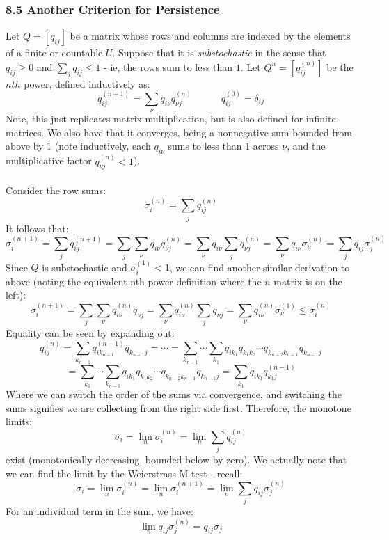 \documentclass[12pt,a4paper]{article}
\newcommand{\1}[1]{\mathbbm{1}\left\{ #1 \right\}}
\begin{document}
\subsubsection{8.5 Another Criterion for Persistence} Let $Q = [q_{ij}]$ be a matrix whose rows and columns are indexed by the elements of a finite or countable $U$. Suppose that it is \textit{substochastic} in the sense that $q_{ij} \geq 0$ and $\sum_j q_{ij} \leq 1$ - ie, the rows sum to less than $1$. Let $Q^n = [q_{ij}^{(n)}]$ be the $nth$ power, defined inductively as:
$$
	q_{ij}^{(n+1)} = \sum_\nu q_{i\nu}q_{\nu j}^{(n)} \quad\quad\quad
	q_{ij}^{(0)} = \delta_{ij}
$$
Note, this just replicates matrix multiplication, but is also defined for infinite matrices. We also have that it converges, being a nonnegative sum bounded from above by $1$ (note inductively, each $q_{i\nu}$ sums to less than $1$ across $\nu$, and the multiplicative factor $q_{\nu j}^{(n)} < 1$). 
\\\\
Consider the row sums:
$$
	\sigma_i^{(n)} = \sum_j q_{ij}^{(n)}
$$
It follows that:
$$
	\sigma_i^{(n+1)} = \sum_j q_{ij}^{(n + 1)} =
	\sum_j \sum_\nu q_{i\nu}q_{\nu j}^{(n)} =
	\sum_\nu q_{i\nu} \sum_j q_{\nu j}^{(n)} =
	\sum_\nu q_{i\nu} \sigma_\nu^{(n)} =
	\sum_j q_{ij} \sigma_j^{(n)}
$$
Since $Q$ is substochastic and $\sigma_i^{(1)} < 1$, we can find another similar derivation to above (noting the equivalent nth power definition where the $n$ matrix is on the left):
$$
	\sigma_i^{(n+1)} = \sum_j \sum_\nu q_{i\nu}^{(n)}q_{\nu j} = 
	\sum_\nu q_{i\nu}^{(n)} \sum_j q_{\nu j} =
	\sum_\nu q_{i\nu}^{(n)} \sigma_\nu^{(1)} \leq \sigma_i^{(n)}
$$
Equality can be seen by expanding out:
$$
	q_{ij}^{(n)} = \sum_{k_{n-1}} q_{ik_{n-1}}^{(n-1)} q_{k_{n-1}j} = \cdots
	= \sum_{k_{n-1}} \cdots \sum_{k_1} q_{ik_1} q_{k_1k_2} \cdots q_{k_{n-2}k_{n-1}} q_{k_{n-1}j}
$$
$$
	= \sum_{k_1} \cdots \sum_{k_{n-1}} q_{ik_1} q_{k_1k_2} \cdots q_{k_{n-2}k_{n-1}} q_{k_{n-1}j} =
	\sum_{k_1} q_{ik_1} q_{k_1j}^{(n-1)}
$$
Where we can switch the order of the sums via convergence, and switching the sums signifies we are collecting from the right side first. Therefore, the monotone limits:
$$
	\sigma_i = \lim_n \sigma_i^{(n)} = \lim_n \sum_j q_{ij}^{(n)}
$$
exist (monotonically decreasing, bounded below by zero). We actually note that we can find the limit by the Weierstrass M-test - recall:
$$
	\sigma_i = \lim_n \sigma_i^{(n)} = \lim_n \sigma_i^{(n + 1)} =
	\lim_n \sum_j q_{ij} \sigma_j^{(n)}
$$
For an individual term in the sum, we have:
$$
	\lim_n q_{ij} \sigma_j^{(n)} = q_{ij} \sigma_j
$$
\end{document}
